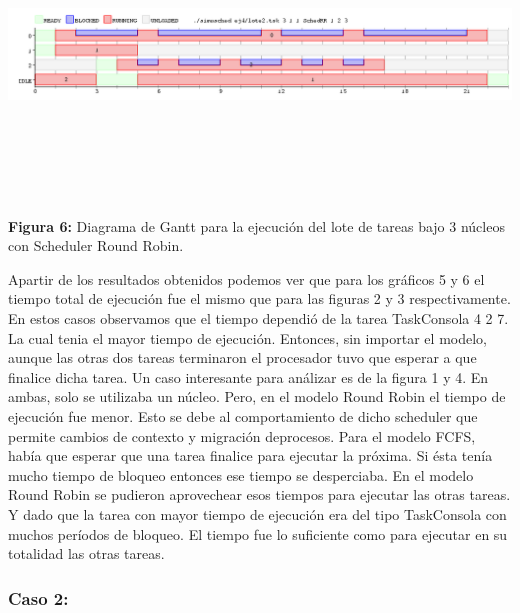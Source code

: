 \documentclass[a4paper]{article}
\begin{document}
  \includegraphics[width=\textwidth,height=3.0in,keepaspectratio]{imagenes/ej4/3core.png} \newline
\begin {flushleft}
\textbf{Figura 6:} Diagrama de Gantt para la ejecuci\'on del lote de tareas bajo 3 n\'ucleos con Scheduler Round Robin.
\end{flushleft}
 
\bigskip 
 
Apartir de los resultados obtenidos podemos ver que para los gráficos 5 y 6 el tiempo total de ejecución fue el mismo que para las figuras 2 y 3 respectivamente. En estos casos observamos que el tiempo dependió de la tarea TaskConsola 4 2 7. La cual tenia el mayor tiempo de ejecución. Entonces, sin importar el modelo, aunque las otras dos tareas terminaron el procesador tuvo que esperar a que finalice dicha tarea. Un caso interesante para análizar es de la figura 1 y 4. En ambas, solo se utilizaba un núcleo. Pero, en el modelo Round Robin el tiempo de ejecución fue menor. Esto se debe al comportamiento de dicho scheduler que permite cambios de contexto y migración deprocesos. Para el modelo FCFS, había que esperar que una tarea finalice para ejecutar la próxima. Si ésta tenía mucho tiempo de bloqueo entonces ese tiempo se desperciaba. En el modelo Round Robin se pudieron aprovechear esos tiempos para ejecutar las otras tareas. Y dado que la tarea con mayor tiempo de ejecución era del tipo TaskConsola con muchos períodos de bloqueo. El tiempo fue lo suficiente como para ejecutar en su totalidad las otras tareas.  
 \bigskip
 
 \subsubsection{Caso 2:}
 
\end{document}
